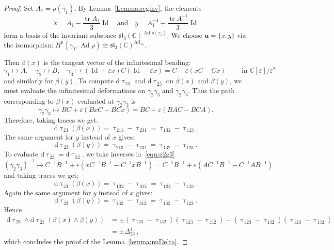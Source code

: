 \documentclass[11pt]{article}
\theoremstyle{definition}
\numberwithin{equation}{section}
\numberwithin{figure}{section}
\numberwithin{table}{section}
\DeclareMathOperator{\Ad}{Ad}
\DeclareMathOperator{\Id}{Id}
\DeclareMathOperator{\tr}{tr}
\newcommand{\Cbb}{\mathbb{C}}
\newcommand{\slfrk}{\mathfrak{sl}}
\newcommand{\ubf}{\mathbf{u}}
\newcommand*{\dd}{\mathrm{d}}
\begin{document}
\begin{proof}
Set $A_1 = \rho(\gamma_1)$. By Lemma~\ref{Lemma:reginv}, the elements
\[
x=A_1-\frac{\tr A_1 }{3}\Id\quad \text{and}\quad y=A_1^{-1}-\frac{\tr A_1^{-1}}{3}\Id
\]
form a basis of the invariant subspace $\slfrk_3(\Cbb)^{\Ad\rho(\gamma_1)}$. We choose $\ubf=\{x,y\}$ via the isomorphism $H^0(\gamma_1,\Ad\rho)\cong \slfrk_3(\Cbb)^{{\Ad}_{A_1}}$.



Then $\beta(x)$ is the tangent vector of the infinitesimal bending:
\[
\gamma_1\mapsto A, \quad \gamma_2\mapsto B, \quad \gamma_3\mapsto (\Id+\varepsilon x)C(\Id-\varepsilon x)= C+\varepsilon(xC-Cx)
\qquad \text{ in }\Cbb[\varepsilon]/\varepsilon^2
\]
and similarly for $\beta(y)$. To compute $\dd\uptau_{23}$ and $\dd\uptau_{\bar 2\bar 3}$ on $\beta(x)$ and $\beta(y)$, we must evaluate the infinitesimal deformations on $\gamma_2\gamma_3$ and $\bar\gamma_2\bar\gamma_3$. Thus the path corresponding to $\beta(x)$ evaluated at $\gamma_2\gamma_3$ is
\begin{equation}\label{eqn:g2g3}
\gamma_2\gamma_3\mapsto BC+\varepsilon(BxC-BCx)= BC+\varepsilon(BAC-BCA).
\end{equation}
Therefore, taking traces we get:
\begin{equation}\label{eqn:dt23x}
\dd\uptau_{23}(\beta(x))=\uptau_{213}-\uptau_{231}=\uptau_{132}-\uptau_{123}.
\end{equation}
The same argument for $y$ instead of $x$ gives:
\begin{equation}\label{eqn:dt23y}
\dd\uptau_{23}(\beta(y))=\uptau_{2\bar 13}-\uptau_{23\bar 1}=\uptau_{\bar 132}-\uptau_{\bar 123}.
\end{equation}
To evaluate $\dd\uptau_{\bar 2\bar 3}=\dd\uptau_{\bar 3\bar 2}$, we take inverses in~\eqref{eqn:g2g3}
\begin{equation}\label{eqn:barg3g3}
(\gamma_2\gamma_3)^{-1}\mapsto C^{-1}B^{-1}+\varepsilon(xC^{-1}B^{-1}-C^{-1}xB^{-1})= C^{-1}B^{-1}+\varepsilon(AC^{-1}B^{-1}-C^{-1}AB^{-1})
\end{equation}
and taking traces we get:
\begin{equation}\label{eqn:dtbar23x}
\dd\uptau_{\bar 2\bar 3}(\beta(x))=\uptau_{1\bar 3\bar 2}-\uptau_{\bar 31\bar 2}=\uptau_{1\bar 3\bar 2}-\uptau_{1\bar 2\bar 3}.
\end{equation}
Again the same argument for $y$ instead of $x$ gives:
\begin{equation}\label{eqn:dtbar23y}
\dd\uptau_{\bar 2\bar 3}(\beta(y))=\uptau_{\bar 1\bar 3\bar 2}-\uptau_{\bar 3\bar 1\bar 2}=\uptau_{\bar 1\bar 3\bar 2}-\uptau_{\bar 1\bar 2\bar 3}.
\end{equation}
Hence
\begin{align*}
\dd\uptau_{23}\wedge \dd\uptau_{\bar 2\bar 3}(\beta(x)\wedge\beta(y)) &=\pm (\uptau_{123}-\uptau_{132}) (\uptau_{\bar 1\bar 2\bar 3}-\uptau_{\bar 1\bar 3\bar 2}) - (\uptau_{1\bar 2\bar 3}-\uptau_{1\bar 3\bar 2}) (\uptau_{\bar 1 2 3}-\uptau_{\bar 1 3 2 }) \\
&=\pm
\varDelta^1_{23}\,,
\end{align*}
which concludes the proof of the Lemma~\ref{lemma:nuDelta}.
\end{proof}
\end{document}
